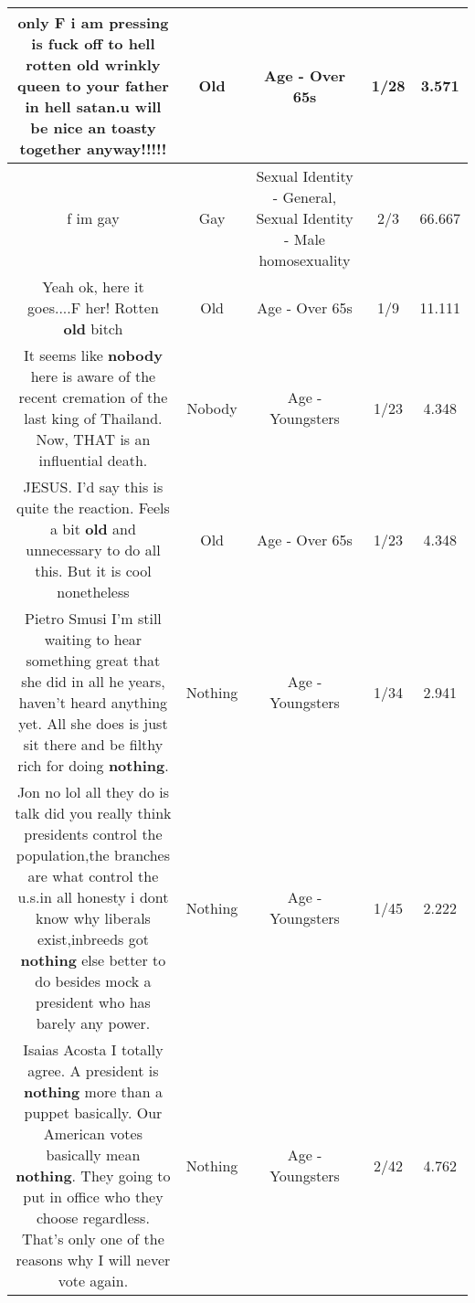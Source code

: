\documentclass[11pt]{article}
\newlength\mylength
\begin{document}
\begin{center}
\begin{longtable}{|C{.65\mylength}|C{.30\mylength}|C{.12\mylength}|C{.12\mylength}|C{.12\mylength}|}
  \small only F i am pressing is fuck off to hell rotten \textbf{old} wrinkly queen to your father in hell satan.u will be nice an toasty together anyway!!!!!\normalsize   & Old & Age - Over 65s & 1/28 & 3.571 \\  \hline
  \small f im gay\normalsize   & Gay & Sexual Identity - General, Sexual Identity - Male homosexuality & 2/3 & 66.667 \\  \hline
  \small Yeah ok, here it goes....F her! Rotten \textbf{old} bitch\normalsize   & Old & Age - Over 65s & 1/9 & 11.111 \\  \hline
  \small It seems like \textbf{nobody} here is aware of the recent cremation of the last king of Thailand. Now, THAT is an influential death.\normalsize   & Nobody & Age - Youngsters & 1/23 & 4.348 \\  \hline
  \small JESUS. I'd say this is quite the reaction. Feels a bit \textbf{old} and unnecessary to do all this. But it is cool nonetheless\normalsize   & Old & Age - Over 65s & 1/23 & 4.348 \\  \hline
  \small Pietro Smusi I'm still waiting to hear something great that she did in all he years, haven't heard anything yet. All she does is just sit there and be filthy rich for doing \textbf{nothing}.\normalsize   & Nothing & Age - Youngsters & 1/34 & 2.941 \\  \hline
  \small Jon no lol all they do is talk did you really think presidents control the population,the branches are what control the u.s.in all honesty i dont know why liberals exist,inbreeds got \textbf{nothing} else better to do besides mock a president who has barely any power.\normalsize   & Nothing & Age - Youngsters & 1/45 & 2.222 \\  \hline
  \small Isaias Acosta I totally agree. A president is \textbf{nothing} more than a puppet basically. Our American votes basically mean \textbf{nothing}. They going to put in office who they choose regardless. That's only one of the reasons why I will never vote again.\normalsize   & Nothing & Age - Youngsters & 2/42 & 4.762 \\  \hline

\end{longtable}
\end{center}
\end{document}
